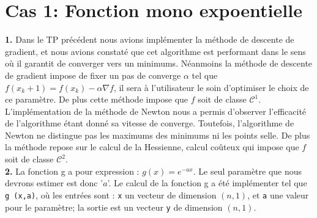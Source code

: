 \documentclass[12pt]{article}
\begin{document}
\newpage 


\newpage

\begin{center}
\end{center}
\vspace{0.5cm}

\section*{\color{brick} Cas 1:  Fonction mono expoentielle}
\textbf{\color{brick}1.} 
Dans le TP précédent nous avions implémenter la méthode de descente de gradient, et nous avions constaté que cet algorithme est performant dans le sens où il garantit de converger vers un minimums. Néanmoins la méthode de descente de gradient impose de fixer un pas de converge $\alpha$ tel que $f(x_k+1) = f(x_k) - \alpha \nabla f $, il sera à l'utilisateur le soin d'optimiser le choix de ce paramètre. De plus cette méthode impose que $f$ soit de classe $\mathcal{C}^1$.\\
L'implémentation de la méthode de Newton nous a permis d'observer l'efficacité de l'algorithme étant donné sa vitesse de converge. Toutefois, l'algorithme de Newton ne distingue pas les maximums des minimums ni les points selle. De plus la méthode repose sur le calcul de la Hessienne, calcul coûteux qui impose que $f$ soit de classe $\mathcal{C}^2$.\\

\textbf{\color{brick}2.} La fonction g a pour expression : $g(x) = e ^{-ax}$. Le seul paramètre que nous devrons estimer est donc '$a$'. Le calcul de la fonction g a été implémenter tel que \verb|g (x,a)|, où les entrées sont : \verb|x|  un vecteur de dimension $(n,1)$, et \verb|a| une valeur pour le paramètre; la sortie est un vecteur \verb|y| de dimension $(n,1)$. \\
\end{document}
